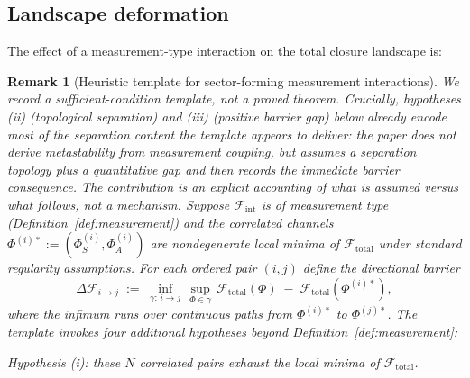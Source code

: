 \documentclass[12pt]{article}
\newtheorem{remark}[theorem]{Remark}
\newcommand{\Fcal}{\mathcal{F}}
\begin{document}
\subsection{Landscape deformation}

The effect of a measurement-type interaction on the total closure landscape is:

\begin{remark}[Heuristic template for sector-forming measurement interactions]\label{rem:basins}
We record a sufficient-condition \emph{template}, not a proved theorem. Crucially, hypotheses (ii) (topological separation) and (iii) (positive barrier gap) below already encode most of the separation content the template appears to deliver: the paper does \emph{not} derive metastability from measurement coupling, but assumes a separation topology plus a quantitative gap and then records the immediate barrier consequence. The contribution is an explicit accounting of what is assumed versus what follows, not a mechanism. Suppose $\Fcal_{\mathrm{int}}$ is of measurement type (Definition~\ref{def:measurement}) and the correlated channels $\Phi^{(i)*} := (\Phi_S^{(i)}, \Phi_A^{(i)})$ are nondegenerate local minima of $\Fcal_{\mathrm{total}}$ under standard regularity assumptions. For each ordered pair $(i,j)$ define the directional barrier
\[
    \Delta\Fcal_{i\to j} \;:=\; \inf_{\gamma:\,i \to j}\,\sup_{\Phi \in \gamma}\, \Fcal_{\mathrm{total}}(\Phi) \;-\; \Fcal_{\mathrm{total}}(\Phi^{(i)*}),
\]
where the infimum runs over continuous paths from $\Phi^{(i)*}$ to $\Phi^{(j)*}$. The template invokes four additional hypotheses beyond Definition~\ref{def:measurement}:

\emph{Hypothesis (i):} these $N$ correlated pairs exhaust the local minima of $\Fcal_{\mathrm{total}}$.


\end{remark}
\end{document}
